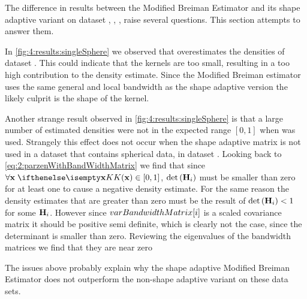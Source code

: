 
The difference in results between the Modified Breiman Estimator and its shape adaptive variant on dataset \ferdosiOne, \baakmanOne, \baakmanFour, \baakmanFive raise several questions. This section attempts to answer them.

	In \cref{fig:4:results:singleSphere} we observed that \sambe overestimates the densities of dataset \ferdosiOne. This could indicate that the kernels are too small, resulting in a too high contribution to the density estimate. Since the Modified Breiman estimator uses the same general and local bandwidth as the shape adaptive version the likely culprit is the shape of the kernel.

Another strange result observed in \cref{fig:4:results:singleSphere} is that a large number of estimated densities were not in the expected range $[0, 1]$ when \sambe was used. Strangely this effect does not occur when the shape adaptive matrix is not used in a dataset that contains spherical data, \ie in dataset \ferdosiOne. Looking back to \cref{eq:2:parzenWithBandWidthMatrix} we find that since $\forall \varPattern\; \varKernel{\varPattern} \in[0, 1]$, $\det\left(\varBandwidthMatrix[\itXis]\right)$ must be smaller than zero for at least one \varPattern[\itXis] to cause a negative density estimate. For the same reason the density estimates that are greater than zero must be the result of $\det\left(\varBandwidthMatrix[\itXis]\right) < 1$ for some $\varBandwidthMatrix[\itXis]$. However since $varBandwidthMatrix[i]$ is a scaled covariance matrix it should be positive semi definite, which is clearly not the case, since the determinant is smaller than zero. Reviewing the eigenvalues of the bandwidth matrices we find that they are near zero \


The issues above probably explain why the shape adaptive Modified Breiman Estimator does not outperform the non-shape adaptive variant on these data sets.
